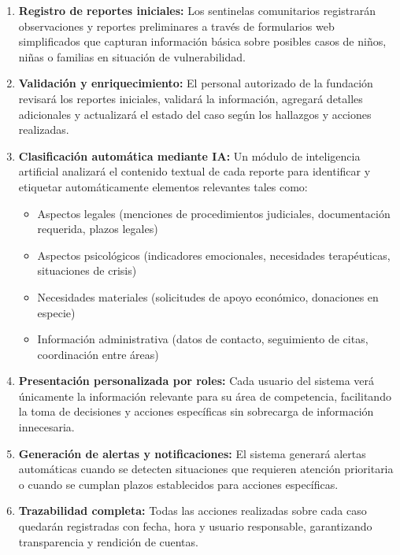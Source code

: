 \documentclass[12pt,letterpaper]{article}
\begin{document}
\begin{enumerate}
    \item \textbf{Registro de reportes iniciales:} Los sentinelas comunitarios registrarán observaciones y reportes preliminares a través de formularios web simplificados que capturan información básica sobre posibles casos de niños, niñas o familias en situación de vulnerabilidad.
    
    \item \textbf{Validación y enriquecimiento:} El personal autorizado de la fundación revisará los reportes iniciales, validará la información, agregará detalles adicionales y actualizará el estado del caso según los hallazgos y acciones realizadas.
    
    \item \textbf{Clasificación automática mediante IA:} Un módulo de inteligencia artificial analizará el contenido textual de cada reporte para identificar y etiquetar automáticamente elementos relevantes tales como:
    \begin{itemize}
        \item Aspectos legales (menciones de procedimientos judiciales, documentación requerida, plazos legales)
        \item Aspectos psicológicos (indicadores emocionales, necesidades terapéuticas, situaciones de crisis)
        \item Necesidades materiales (solicitudes de apoyo económico, donaciones en especie)
        \item Información administrativa (datos de contacto, seguimiento de citas, coordinación entre áreas)
    \end{itemize}
    
    \item \textbf{Presentación personalizada por roles:} Cada usuario del sistema verá únicamente la información relevante para su área de competencia, facilitando la toma de decisiones y acciones específicas sin sobrecarga de información innecesaria.
    
    \item \textbf{Generación de alertas y notificaciones:} El sistema generará alertas automáticas cuando se detecten situaciones que requieren atención prioritaria o cuando se cumplan plazos establecidos para acciones específicas.
    
    \item \textbf{Trazabilidad completa:} Todas las acciones realizadas sobre cada caso quedarán registradas con fecha, hora y usuario responsable, garantizando transparencia y rendición de cuentas.
\end{enumerate}
\end{document}

